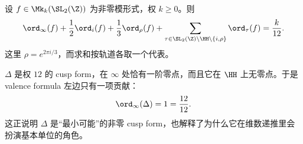 \begin{lemma}
\label{lem:valence-formula}
设 $f\in \Mk_k(\SL_2(\Z))$ 为非零模形式，权 $k\ge 0$。则
\[
  \ord_\infty(f)+\frac{1}{2}\ord_i(f)+\frac{1}{3}\ord_\rho(f)
  +\sum_{\tau\in \SL_2(\Z)\backslash\HH\setminus\{i,\rho\}} \ord_\tau(f)
  =\frac{k}{12}.
\]
这里 $\rho=e^{2\pi i/3}$，而求和按轨道各取一个代表。
\end{lemma}

\begin{example}
\label{ex:valence-delta}
$\Delta$ 是权 $12$ 的 cusp form，在 $\infty$ 处恰有一阶零点，而且它在 $\HH$ 上无零点。于是 valence formula 左边只有一项贡献：
\[
  \ord_\infty(\Delta)=1=\frac{12}{12}.
\]
这正说明 $\Delta$ 是“最小可能”的非零 cusp form，也解释了为什么它在维数递推里会扮演基本单位的角色。
\end{example}

